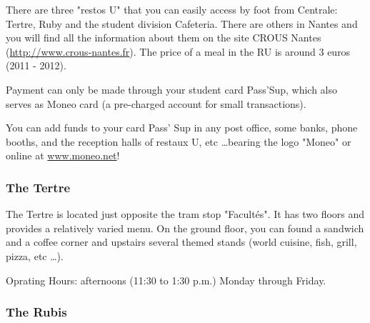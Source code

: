 
There are three "restos U" that you can easily access by foot from Centrale: Tertre, Ruby and the student division Cafeteria. There are others in Nantes and you will find all the information about them on the site CROUS Nantes (\url{http://www.crous-nantes.fr}). The price of a meal in the RU is around 3 euros (2011 - 2012).

Payment can only be made through your student card Pass'Sup, which also serves as Moneo card (a pre-charged account for small transactions).

You can add funds to your card Pass' Sup in any post office, some banks, phone booths, and the reception halls of restaux U, etc \dots bearing the logo "Moneo" or online at \url{www.moneo.net}!

\subsubsection{The Tertre}


The Tertre is located just opposite the tram stop "Facultés". It has two floors and provides a relatively varied menu.
On the ground floor, you can found a sandwich and a coffee corner and upstairs several themed stands (world cuisine, fish, grill, pizza, etc \dots).

Oprating Hours: afternoons (11:30 to 1:30 p.m.) Monday through Friday.
\subsubsection{The Rubis}

